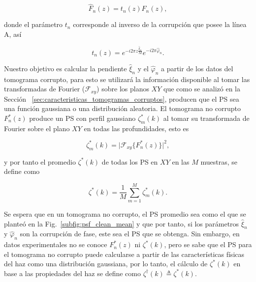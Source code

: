 \begin{equation}
\label{eq:f_est}
\hat{F}_n(z) = t_n(z) F_n(z),
\end{equation}

\noindent donde el parámetro $t_n$ corresponde al inverso de la corrupción que posee la línea A, así

\begin{equation}
t_n(z) = e^{-i2\pi z \frac{\hat{\xi}_n}{M}}e^{-i2\pi \hat{\varphi}_n}.
\end{equation}

\noindent Nuestro objetivo es calcular la pendiente $\hat{\xi}_n$ y el \offset $\hat{\varphi}_n$ a partir de los datos del tomograma corrupto, para esto se utilizará la información disponible al tomar las transformadas de Fourier ($\mathscr{F}_{xy}$) sobre los planos $XY$ que como se analizó en la Sección~ \ref{sec:caracteristicas_tomogramas_corruptos}, producen que el PS sea una función gaussiana o una distribución aleatoria. El tomograma no corrupto $F^{\ast}_n(z)$ produce un PS con perfil gaussiano $\zeta^{\ast}_m(k)$ al tomar su transformada de Fourier sobre el plano $XY$ en todas las profundidades, esto es

\begin{equation}
\zeta^{\ast}_m(k) = \bigg\lvert \mathscr{F}_{xy} \big\{F^{\ast}_n(z)\big\}\bigg\rvert^2,
\end{equation}

\noindent y por tanto el promedio $\zeta^{\ast}(k)$ de todas los PS en $XY$ en las $M$ muestras, se define como

\begin{equation}
\zeta^{\ast}(k) = \frac{1}{M}\sum_{m=1}^{M} \zeta^{\ast}_m(k).
\end{equation}

\noindent Se espera que en un tomograma no corrupto, el PS promedio sea como el que se planteó en la Fig.~\ref{subfig:psf_clean_mean} y que por tanto, si los parámetros $\hat{\xi}_n$ y $\hat{\varphi}_n$ son la corrupción de fase, este sea el PS que se obtenga. Sin embargo, en datos experimentales no se conoce $F^{\ast}_n(z)$ ni $\zeta^{\ast}(k)$, pero se sabe que el PS para el tomograma no corrupto puede calcularse a partir de las características físicas del haz como una distribución gaussiana, por lo tanto, el cálculo de $\zeta^{\ast}(k)$ en base a las propiedades del haz se define como $\zeta^{\dagger}(k) \triangleq \zeta^{\ast}(k)$.


